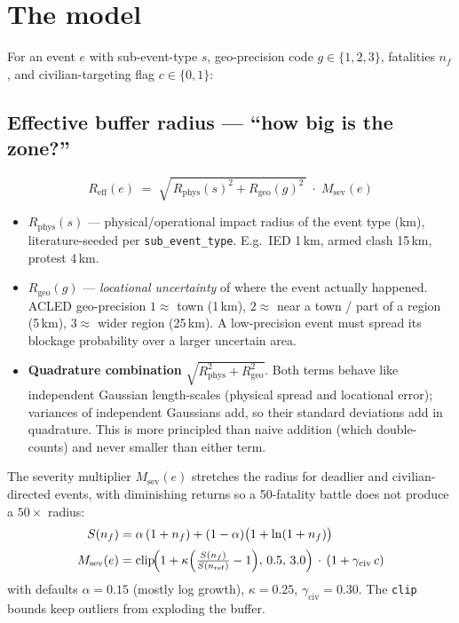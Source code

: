 \documentclass[11pt,a4paper]{article}
\newcommand{\code}[1]{\texttt{\small #1}}
\newcommand{\Reff}{R_{\mathrm{eff}}}
\newcommand{\Rphys}{R_{\mathrm{phys}}}
\newcommand{\Rgeo}{R_{\mathrm{geo}}}
\newcommand{\Msev}{M_{\mathrm{sev}}}
\begin{document}
\section{The model}

For an event $e$ with sub-event-type $s$, geo-precision code $g\in\{1,2,3\}$, fatalities
$n_f$, and civilian-targeting flag $c\in\{0,1\}$:

\subsection{Effective buffer radius --- ``how big is the zone?''}

\begin{equation}
\Reff(e) \;=\; \sqrt{\,\Rphys(s)^2 + \Rgeo(g)^2\,}\;\cdot\;\Msev(e)
\label{eq:reff}
\end{equation}

\begin{itemize}[nosep,leftmargin=1.4em]
  \item $\Rphys(s)$ --- physical/operational impact radius of the event type (km),
        literature-seeded per \code{sub\_event\_type}. E.g.\ IED 1\,km, armed clash 15\,km,
        protest 4\,km.
  \item $\Rgeo(g)$ --- \emph{locational uncertainty} of where the event actually happened.
        ACLED geo-precision $1\approx$ town (1\,km), $2\approx$ near a town / part of a region
        (5\,km), $3\approx$ wider region (25\,km). A low-precision event must spread its
        blockage probability over a larger uncertain area.
  \item \textbf{Quadrature combination} $\sqrt{\Rphys^2+\Rgeo^2}$. Both terms behave like
        independent Gaussian length-scales (physical spread and locational error); variances of
        independent Gaussians add, so their standard deviations add in quadrature. This is more
        principled than naive addition (which double-counts) and never smaller than either term.
\end{itemize}

The severity multiplier $\Msev(e)$ stretches the radius for deadlier and civilian-directed
events, with diminishing returns so a 50-fatality battle does not produce a $50\times$ radius:
\begin{align}
S(n_f)   &= \alpha\,(1+n_f) + (1-\alpha)\bigl(1+\ln(1+n_f)\bigr) \label{eq:sev}\\[2pt]
\Msev(e) &= \operatorname{clip}\!\Bigl(1 + \kappa\Bigl(\tfrac{S(n_f)}{S(n_{\mathrm{ref}})}-1\Bigr),\,
            0.5,\,3.0\Bigr)\,\cdot\,(1+\gamma_{\mathrm{civ}}\,c) \label{eq:msev}
\end{align}
with defaults $\alpha=0.15$ (mostly log growth), $\kappa=0.25$, $\gamma_{\mathrm{civ}}=0.30$.
The \code{clip} bounds keep outliers from exploding the buffer.
\end{document}

